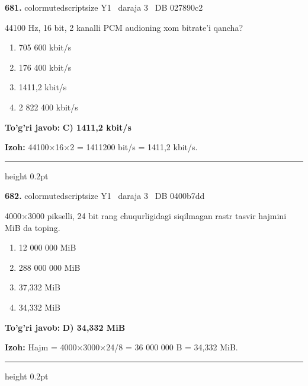 \documentclass[10pt,a4paper,oneside]{article}
\begin{document}
\noindent\textbf{\color{ink}681.}  {color{muted}scriptsize Y1 \textbullet\ daraja 3 \textbullet\ DB 027890c2}
\par
44100 Hz, 16 bit, 2 kanalli PCM audioning xom bitrate'i qancha?
\begin{enumerate}[label=\Alph*),leftmargin=9mm]
\item 705 600 kbit/s
\item 176 400 kbit/s
\item 1411,2 kbit/s
\item 2 822 400 kbit/s
\end{enumerate}
\begin{tcolorbox}[enhanced,breakable,colback=teal!4,colframe=teal!50!black,boxrule=0.5pt,arc=1.1mm,left=3mm,right=3mm,top=1.7mm,bottom=1.7mm,before skip=2mm,after skip=2mm]
\textbf{\color{teal}To'g'ri javob:} \textbf{C) 1411,2 kbit/s}
\par\smallskip
\textbf{Izoh:} 44100\ensuremath{\times}16\ensuremath{\times}2 = 1411200 bit/s = 1411,2 kbit/s.
\end{tcolorbox}
\vspace{2mm}\hrule height 0.2pt \vspace{3mm}

\noindent\textbf{\color{ink}682.}  {color{muted}scriptsize Y1 \textbullet\ daraja 3 \textbullet\ DB 0400b7dd}
\par
4000\ensuremath{\times}3000 pikselli, 24 bit rang chuqurligidagi siqilmagan rastr tasvir hajmini MiB da toping.
\begin{enumerate}[label=\Alph*),leftmargin=9mm]
\item 12 000 000 MiB
\item 288 000 000 MiB
\item 37,332 MiB
\item 34,332 MiB
\end{enumerate}
\begin{tcolorbox}[enhanced,breakable,colback=teal!4,colframe=teal!50!black,boxrule=0.5pt,arc=1.1mm,left=3mm,right=3mm,top=1.7mm,bottom=1.7mm,before skip=2mm,after skip=2mm]
\textbf{\color{teal}To'g'ri javob:} \textbf{D) 34,332 MiB}
\par\smallskip
\textbf{Izoh:} Hajm = 4000\ensuremath{\times}3000\ensuremath{\times}24/8 = 36 000 000 B = 34,332 MiB.
\end{tcolorbox}
\vspace{2mm}\hrule height 0.2pt \vspace{3mm}
\end{document}
